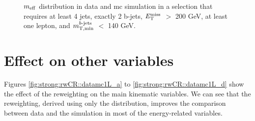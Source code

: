 \begin{figure}[htbp]
\centering
{}
\caption{$m_{\mathrm{eff}}$ distribution in data and \gls{mc} simulation in a selection that requires at least 4 jets, exactly 2 b-jets, $E_{\rm T}^{\mathrm{miss}}$ $>$ 200 GeV,
at least one lepton, and $m_{\mathrm{T, min}}^{b\textrm{-jets}}$ $<$ 140 GeV.}
\label{fig:meff_in2b_no_corr}
\end{figure}



\section{Effect on other variables}

Figures \ref{fig:strong:rwCR::datamc1L_a} to \ref{fig:strong:rwCR::datamc1L_d}
show the effect of the reweighting on the main kinematic variables.
We can see that the reweighting, derived using only the \meff distribution, improves the 
comparison between data and the simulation 
in most of the energy-related variables.

